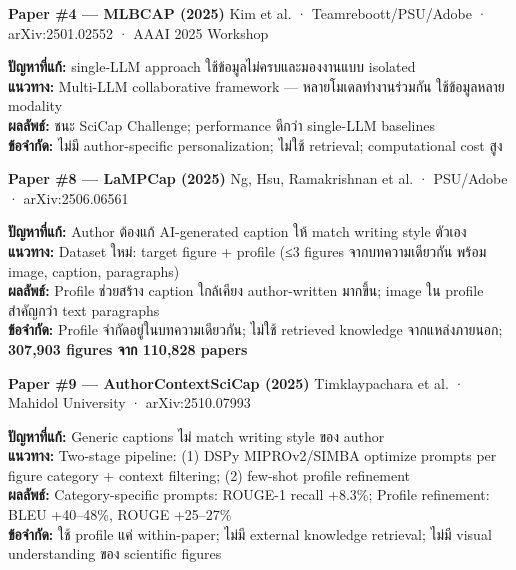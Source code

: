 \documentclass[10pt,a4paper]{article}
\begin{document}
\vspace{6pt}
\textbf{Paper \#4 — MLBCAP (2025)}
\hfill {\color{muted}\small Kim et al. · Teamreboott/PSU/Adobe · arXiv:2501.02552 · AAAI 2025 Workshop}

\begin{infobox}
\textbf{ปัญหาที่แก้:} single-LLM approach ใช้ข้อมูลไม่ครบและมองงานแบบ isolated\\
\textbf{แนวทาง:} Multi-LLM collaborative framework — หลายโมเดลทำงานร่วมกัน ใช้ข้อมูลหลาย modality\\
\textbf{ผลลัพธ์:} ชนะ SciCap Challenge; performance ดีกว่า single-LLM baselines\\
\textbf{ข้อจำกัด:} ไม่มี author-specific personalization; ไม่ใช้ retrieval; computational cost สูง
\end{infobox}

\vspace{6pt}
\textbf{Paper \#8 — LaMPCap (2025)}
\hfill {\color{muted}\small Ng, Hsu, Ramakrishnan et al. · PSU/Adobe · arXiv:2506.06561}

\begin{infobox}
\textbf{ปัญหาที่แก้:} Author ต้องแก้ AI-generated caption ให้ match writing style ตัวเอง\\
\textbf{แนวทาง:} Dataset ใหม่: target figure + profile (≤3 figures จากบทความเดียวกัน พร้อม image, caption, paragraphs)\\
\textbf{ผลลัพธ์:} Profile ช่วยสร้าง caption ใกล้เคียง author-written มากขึ้น; image ใน profile สำคัญกว่า text paragraphs\\
\textbf{ข้อจำกัด:} Profile จำกัดอยู่ในบทความเดียวกัน; ไม่ใช้ retrieved knowledge จากแหล่งภายนอก; \textbf{307,903 figures จาก 110,828 papers}
\end{infobox}

\vspace{6pt}
\textbf{Paper \#9 — AuthorContextSciCap (2025)}
\hfill {\color{muted}\small Timklaypachara et al. · Mahidol University · arXiv:2510.07993}

\begin{infobox}
\textbf{ปัญหาที่แก้:} Generic captions ไม่ match writing style ของ author\\
\textbf{แนวทาง:} Two-stage pipeline: (1) DSPy MIPROv2/SIMBA optimize prompts per figure category + context filtering; (2) few-shot profile refinement\\
\textbf{ผลลัพธ์:} Category-specific prompts: ROUGE-1 recall +8.3\%; Profile refinement: BLEU +40–48\%, ROUGE +25–27\%\\
\textbf{ข้อจำกัด:} ใช้ profile แค่ within-paper; ไม่มี external knowledge retrieval; ไม่มี visual understanding ของ scientific figures
\end{infobox}
\end{document}
